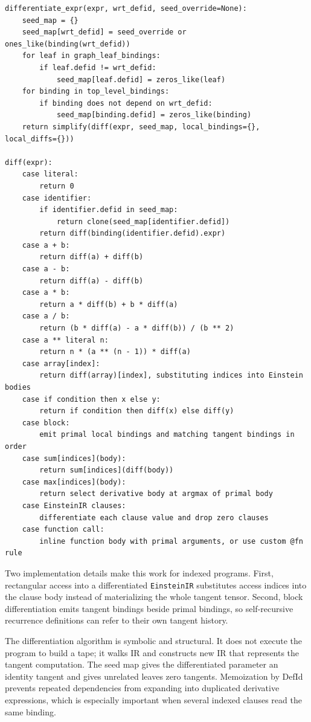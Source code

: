 \begin{lstlisting}[style=pythoncode,caption={Symbolic forward-mode differentiation.}]
differentiate_expr(expr, wrt_defid, seed_override=None):
    seed_map = {}
    seed_map[wrt_defid] = seed_override or ones_like(binding(wrt_defid))
    for leaf in graph_leaf_bindings:
        if leaf.defid != wrt_defid:
            seed_map[leaf.defid] = zeros_like(leaf)
    for binding in top_level_bindings:
        if binding does not depend on wrt_defid:
            seed_map[binding.defid] = zeros_like(binding)
    return simplify(diff(expr, seed_map, local_bindings={}, local_diffs={}))

diff(expr):
    case literal:
        return 0
    case identifier:
        if identifier.defid in seed_map:
            return clone(seed_map[identifier.defid])
        return diff(binding(identifier.defid).expr)
    case a + b:
        return diff(a) + diff(b)
    case a - b:
        return diff(a) - diff(b)
    case a * b:
        return a * diff(b) + b * diff(a)
    case a / b:
        return (b * diff(a) - a * diff(b)) / (b ** 2)
    case a ** literal n:
        return n * (a ** (n - 1)) * diff(a)
    case array[index]:
        return diff(array)[index], substituting indices into Einstein bodies
    case if condition then x else y:
        return if condition then diff(x) else diff(y)
    case block:
        emit primal local bindings and matching tangent bindings in order
    case sum[indices](body):
        return sum[indices](diff(body))
    case max[indices](body):
        return select derivative body at argmax of primal body
    case EinsteinIR clauses:
        differentiate each clause value and drop zero clauses
    case function call:
        inline function body with primal arguments, or use custom @fn rule
\end{lstlisting}

Two implementation details make this work for indexed programs. First,
rectangular access into a differentiated \texttt{EinsteinIR} substitutes access
indices into the clause body instead of materializing the whole tangent tensor.
Second, block differentiation emits tangent bindings beside primal bindings, so
self-recursive recurrence definitions can refer to their own tangent history.

The differentiation algorithm is symbolic and structural. It does not execute
the program to build a tape; it walks IR and constructs new IR that represents
the tangent computation. The seed map gives the differentiated parameter an
identity tangent and gives unrelated leaves zero tangents. Memoization by DefId
prevents repeated dependencies from expanding into duplicated derivative
expressions, which is especially important when several indexed clauses read
the same binding.

